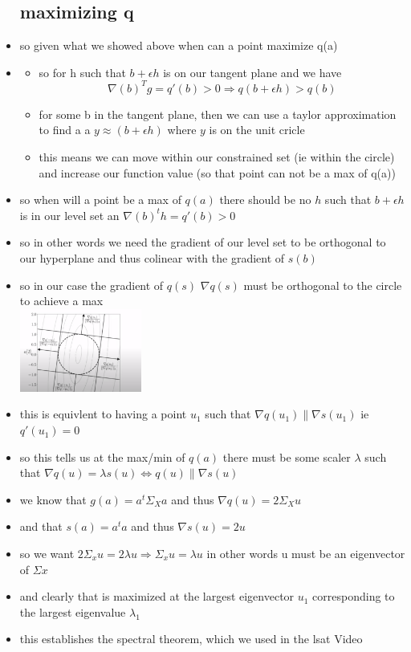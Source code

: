 \documentclass{article}
\begin{document}
\begin{itemize}
\subsection*{maximizing q }
\item so given what we showed above when can a point maximize q(a)
\item \begin{itemize}
\item so for h such that $b+\epsilon h$ is on our tangent plane and we have $$\nabla(b)^{T}g=q'(b)>0\Rightarrow q(b+\epsilon h)>q(b)$$
\item for some b in the tangent plane, then we can use a taylor approximation to find a a $y\approx (b+\epsilon h)$ where $y$ is on the unit cricle
\item this means we can move within our constrained set (ie within the circle) and increase our function value (so that point can not be a max of q(a))
\end{itemize}
\item so when will  a point be a max of $q(a)$ there should be no $h$ such that $b+\epsilon h$ is in our level set an $\nabla(b)^th=q'(b)> 0$
\item so in other words we need the gradient of our level set to be orthogonal to our hyperplane and thus colinear with the gradient of $s(b)$
\item so in our case the gradient of $q(s)$ $\nabla q(s)$ must be orthogonal to the circle to achieve a max \\ \includegraphics*[width=4cm]{notes/week_8/Vedio_3/immages/v3_5.png}
\item this is equivlent to having a point $u_1$ such that $\nabla q(u_1)\parallel \nabla s(u_1)$ ie $q'(u_1)=0$
\item so this tells us at the max/min of $q(a)$ there must be some scaler $\lambda$ such that $\nabla q(u)=\lambda s(u)\iff  q(u)\parallel \nabla s(u)$
\item we know that $g(a)=a^t\Sigma_{X}a$ and thus $\nabla q(u)=2\Sigma_{X} u$
\item and that $s(a)=a^ta$ and thus $\nabla s(u)=2u$ 
\item so we want  $2\Sigma_{x}u=2\lambda u\Rightarrow \Sigma_{x}u=\lambda u$ in other words u must be an eigenvector of $\Sigma x$ 
\item and clearly that is maximized at the largest eigenvector $u_1$ corresponding to the largest eigenvalue $\lambda_1$
\item this establishes the spectral theorem, which we used in the lsat Video
\end{itemize}
\end{document}
